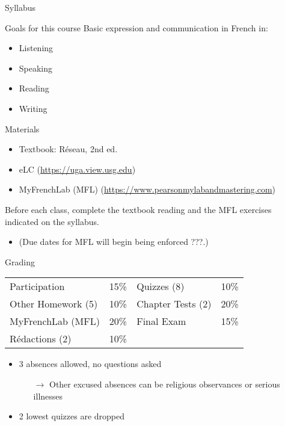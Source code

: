 \begin{frame}
  \begin{center}
    \Huge{Syllabus}
  \end{center}
\end{frame}

\begin{frame}{Goals for this course}
  Basic expression and communication in French in:
  \begin{itemize}
    \item Listening
    \item Speaking
    \item Reading
    \item Writing
  \end{itemize}
\end{frame}

\begin{frame}{Materials}
  \begin{itemize}
    \item Textbook: Réseau, 2nd ed.
    \item eLC (\url{https://uga.view.usg.edu})
    \item MyFrenchLab (MFL) (\url{https://www.pearsonmylabandmastering.com})
  \end{itemize}
  \alert{Before each class}, complete the textbook reading and the MFL exercises indicated on the syllabus.
  \begin{itemize}
    \item (Due dates for MFL will begin being enforced ???.)
  \end{itemize}
\end{frame}

\begin{frame}{Grading}
  \begin{center}
    \begin{tabular}{l l | l l}
      Participation      & 15\% & Quizzes (8)       & 10\% \\
      Other Homework (5) & 10\% & Chapter Tests (2) & 20\% \\
      MyFrenchLab (MFL)  & 20\% & Final Exam        & 15\% \\
      Rédactions (2)     & 10\% &                   &
    \end{tabular}
  \end{center}
  \begin{itemize}
    \item 3 absences allowed, no questions asked
    \begin{itemize}
      \item[$\to$] Other excused absences can be religious observances or serious illnesses
    \end{itemize}
    \item 2 lowest quizzes are dropped
  \end{itemize}
\end{frame}

